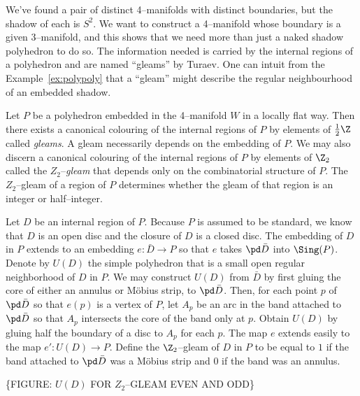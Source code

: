 We've found a pair of distinct 4--manifolds with distinct boundaries, but the shadow of each is $S^2$.
We want to construct a 4--manifold whose boundary is a given 3--manifold, and this shows that we need more than just a naked shadow polyhedron to do so.
The information needed is carried by the internal regions of a polyhedron and are named ``gleams'' by Turaev.
One can intuit from the Example~\ref{ex:polypoly} that a ``gleam'' might describe the regular neighbourhood of an embedded shadow.

\begin{defn}
  Let $P$ be a polyhedron embedded in the 4--manifold $W$ in a locally flat way.
  Then there exists a canonical colouring of the internal regions of $P$ by elements of $\frac{1}{2}\Z$ called \emph{gleams}.
  A gleam necessarily depends on the embedding of $P$.
  We may also discern a canonical colouring of the internal regions of $P$ by elements of $\Z_2$ called the $Z_2$--\emph{gleam} that depends only on the combinatorial structure of $P$.
  The $Z_2$--gleam of a region of $P$ determines whether the gleam of that region is an integer or half--integer.

  Let $D$ be an internal region of $P$.
  Because $P$ is assumed to be standard, we know that $D$ is an open disc and the closure of $D$ is a closed disc.
  The embedding of $D$ in $P$ extends to an embedding $e : \bar{D} \to P$ so that $e$ takes $\pd\bar{D}$ into $\Sing(P)$.
  Denote by $U(D)$ the simple polyhedron that is a small open regular neighborhood of $D$ in $P$.
  We may construct $U(D)$ from $\bar{D}$ by first gluing the core of either an annulus or M\"obius strip, to $\pd\bar{D}$.
  Then, for each point $p$ of $\pd\bar{D}$ so that $e(p)$ is a vertex of $P$, let $A_p$ be an arc in the band attached to $\pd\bar{D}$ so that $A_p$ intersects the core of the band only at $p$.
  Obtain $U(D)$ by gluing half the boundary of a disc to $A_p$ for each $p$.
  The map $e$ extends easily to the map $e':U(D)\to P$.
  Define the $\Z_2$--gleam of $D$ in $P$ to be equal to $1$ if the band attached to $\pd\bar{D}$ was a M\"obius strip and $0$ if the band was an annulus.
  
  \{FIGURE: $U(D)$ FOR $Z_2$--GLEAM EVEN AND ODD\}
  

\end{defn}
